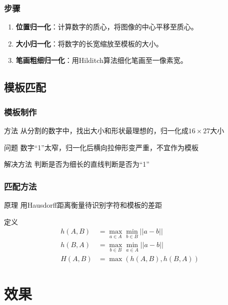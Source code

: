 \documentclass[12pt,hyperref={CJKbookmarks=true}]{beamer}
\begin{document}
\begin{frame}
  \frametitle{步骤}
  \begin{enumerate}
  \item \textbf{位置归一化}：计算数字的质心，将图像的中心平移至质心。
  \item \textbf{大小归一化}：将数字的长宽缩放至模板的大小。
  \item \textbf{笔画粗细归一化}：用Hilditch算法细化笔画至一像素宽。
  \end{enumerate}
\end{frame}

\subsection{模板匹配}


\begin{frame}
  \frametitle{模板制作}
  \begin{block}{方法}
    从分割的数字中，找出大小和形状最理想的，归一化成$16\times 27$大小
  \end{block}
  \begin{block}{问题}
    数字“1”太窄，归一化后横向拉伸形变严重，不宜作为模板
  \end{block}
  \begin{block}{解决方法}
    判断是否为细长的直线判断是否为“1”
  \end{block}
\end{frame}

\begin{frame}
  \frametitle{匹配方法}
  \begin{block}{原理}
    用Hausdorff距离衡量待识别字符和模板的差距
  \end{block}
  \begin{block}{定义}
    \begin{equation*}
      \begin{aligned}
        h(A,B)&=\max_{a\in A}\min_{b\in B}||a-b||\\
        h(B,A)&=\max_{b\in B}\min_{a\in A}||a-b||\\
        H(A,B)&=\max(h(A,B),h(B,A))
      \end{aligned}
    \end{equation*}
  \end{block}
\end{frame}

\section{效果}
\end{document}
